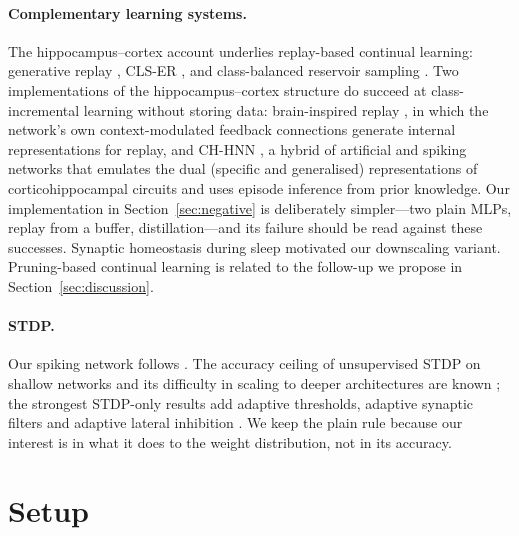 \documentclass[11pt]{article}
\begin{document}
\paragraph{Complementary learning systems.} The hippocampus--cortex account \citep{mcclelland1995,kumaran2016} underlies
replay-based continual learning: generative replay \citep{shin2017}, CLS-ER \citep{arani2022}, and class-balanced reservoir
sampling \citep{chrysakis2020}. Two implementations of the hippocampus--cortex structure do succeed at class-incremental
learning without storing data: brain-inspired replay \citep{vandeven2020}, in which the network's own context-modulated
feedback connections generate internal representations for replay, and CH-HNN \citep{shi2025}, a hybrid of artificial and
spiking networks that emulates the dual (specific and generalised) representations of corticohippocampal circuits and uses
episode inference from prior knowledge. Our implementation in Section~\ref{sec:negative} is deliberately simpler---two plain
MLPs, replay from a buffer, distillation---and its failure should be read against these successes. Synaptic homeostasis during sleep \citep{tononi2014} motivated our downscaling variant.
Pruning-based continual learning \citep{mallya2018,golkar2019} is related to the follow-up we propose in
Section~\ref{sec:discussion}.

\paragraph{STDP.} Our spiking network follows \citet{diehl2015}. The accuracy ceiling of unsupervised STDP on shallow
networks and its difficulty in scaling to deeper architectures are known \citep{eshraghian2023}; the strongest STDP-only
results add adaptive thresholds, adaptive synaptic filters and adaptive lateral inhibition \citep{dong2023}. We keep the
plain rule because our interest is in what it does to the weight distribution, not in its accuracy.

\section{Setup}
\label{sec:setup}
\end{document}
